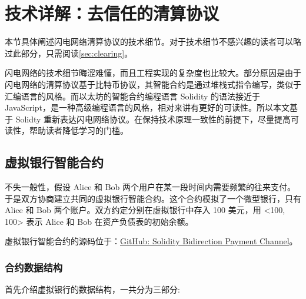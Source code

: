 \section{技术详解：去信任的清算协议}
本节具体阐述闪电网络清算协议的技术细节。对于技术细节不感兴趣的读者可以略过此部分，只需阅读\ref{sec:clearing}。

闪电网络的技术细节晦涩难懂，而且工程实现的复杂度也比较大。部分原因是由于闪电网络的清算协议基于比特币协议，其智能合约是通过堆栈式指令编写，类似于汇编语言的风格。而以太坊的智能合约编程语言 Solidity 的语法接近于 JavaScript，是一种高级编程语言的风格，相对来讲有更好的可读性。所以本文基于 Solidty 重新表达闪电网络协议。在保持技术原理一致性的前提下，尽量提高可读性，帮助读者降低学习的门槛。

\subsection{虚拟银行智能合约}

不失一般性，假设 Alice 和 Bob 两个用户在某一段时间内需要频繁的往来支付。于是双方协商建立共同的虚拟银行智能合约。这个合约模拟了一个微型银行，只有 Alice 和 Bob 两个账户。双方约定分别在虚拟银行中存入 100 美元，用 <100, 100> 表示 Alice 和 Bob 在资产负债表的初始余额。

虚拟银行智能合约的源码位于：\href{https://github.com/dapenghu/solidity-bidirection-payment-channel/blob/master/virtualBank/contracts/VirtualBank.sol}{GitHub: Solidity Bidirection Payment Channel}。

\subsubsection{合约数据结构}
首先介绍虚拟银行的数据结构，一共分为三部分:

